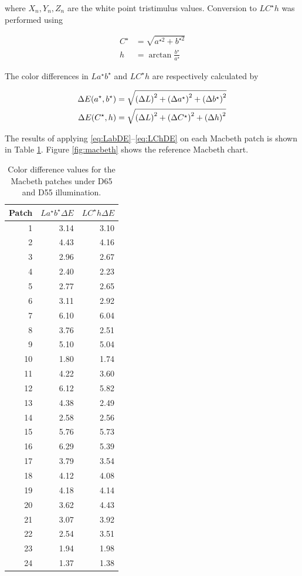 \documentclass[12pt,a4paper]{article}
\begin{document}
\noindent where $X_n, Y_n, Z_n$ are the white point tristimulus values. Conversion to $LC^\star h$ was performed using

\begin{equation}\label{eq:LabtoLCh}
\begin{aligned}
	C^\star &= \sqrt{a^{\star 2} + b^{\star 2}} \\
	h &= \arctan{\frac{b^\star}{a^\star}}
\end{aligned}
\end{equation}

\noindent The color differences in $La^\star b^\star$ and $LC^\star h$ are respectively calculated by

\begin{align}
	\Delta E(a^\star, b^\star) &= \sqrt{\qty(\Delta L)^2 + \qty(\Delta a^\star)^2 + \qty(\Delta b^\star)^2} \label{eq:LabDE} \\
	\Delta E(C^\star, h) &= \sqrt{\qty(\Delta L)^2 + \qty(\Delta C^\star)^2 + \qty(\Delta h)^2} \label{eq:LChDE}
\end{align}

\noindent The results of applying \eqref{eq:LabDE}--\eqref{eq:LChDE} on each Macbeth patch is shown in Table \ref{tab:color-diff}. Figure \ref{fig:macbeth} shows the reference Macbeth chart.

\begin{table}[!htb]
	\centering
	\caption{Color difference values for the Macbeth patches under D65 and D55 illumination.}
	\begin{tabular}{||r|r|r||}
		\hline
		Patch & $La^\star b^\star \Delta E$ & $LC^\star h \Delta E$ \\ \hline \hline
		1  & 3.14 & 3.10 \\
		2  & 4.43 & 4.16 \\
		3  & 2.96 & 2.67 \\
		4  & 2.40 & 2.23 \\
		5  & 2.77 & 2.65 \\
		6  & 3.11 & 2.92 \\
		7  & 6.10 & 6.04 \\
		8  & 3.76 & 2.51 \\
		9  & 5.10 & 5.04 \\
		10 & 1.80 & 1.74 \\
		11 & 4.22 & 3.60 \\
		12 & 6.12 & 5.82 \\
		13 & 4.38 & 2.49 \\
		14 & 2.58 & 2.56 \\
		15 & 5.76 & 5.73 \\
		16 & 6.29 & 5.39 \\
		17 & 3.79 & 3.54 \\
		18 & 4.12 & 4.08 \\
		19 & 4.18 & 4.14 \\
		20 & 3.62 & 4.43 \\
		21 & 3.07 & 3.92 \\
		22 & 2.54 & 3.51 \\
		23 & 1.94 & 1.98 \\
		24 & 1.37 & 1.38 \\ \hline
	\end{tabular}
	\label{tab:color-diff}
\end{table}
\end{document}
